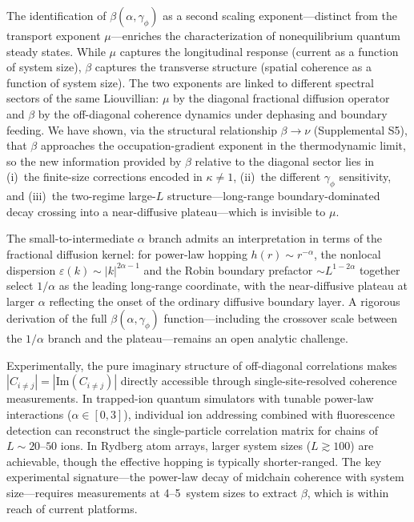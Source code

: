 \documentclass[aps,prd,twocolumn,superscriptaddress,floatfix]{revtex4-2}
\begin{document}
The identification of $\beta(\alpha,\gamma_\phi)$ as a second scaling
exponent---distinct from the transport exponent $\mu$---enriches the
characterization of nonequilibrium quantum steady states. While
$\mu$ captures the longitudinal response (current as a function of
system size), $\beta$ captures the transverse structure (spatial
coherence as a function of system size). The two exponents are linked
to different spectral sectors of the same Liouvillian: $\mu$ by the
diagonal fractional diffusion operator and $\beta$ by the
off-diagonal coherence dynamics under dephasing and boundary feeding.
We have shown, via the structural relationship $\beta \to \nu$
(Supplemental S5), that $\beta$ approaches the occupation-gradient
exponent in the thermodynamic limit, so the new information provided
by $\beta$ relative to the diagonal sector lies in (i)~the
finite-size corrections encoded in $\kappa \neq 1$, (ii)~the different
$\gamma_\phi$ sensitivity, and (iii)~the two-regime large-$L$
structure---long-range boundary-dominated decay crossing into a
near-diffusive plateau---which is invisible to $\mu$.

The small-to-intermediate $\alpha$ branch admits an interpretation in
terms of the fractional diffusion kernel: for power-law hopping
$h(r) \sim r^{-\alpha}$, the nonlocal dispersion
$\varepsilon(k) \sim |k|^{2\alpha-1}$ and the Robin boundary
prefactor $\sim L^{1-2\alpha}$ together select $1/\alpha$ as the
leading long-range coordinate, with the near-diffusive plateau at
larger $\alpha$ reflecting the onset of the ordinary diffusive
boundary layer. A rigorous derivation of the full
$\beta(\alpha,\gamma_\phi)$ function---including the crossover scale
between the $1/\alpha$ branch and the plateau---remains an open
analytic challenge.

Experimentally, the pure imaginary structure of off-diagonal
correlations makes
$|C_{i\neq j}| = |\text{Im}(C_{i\neq j})|$ directly accessible through
single-site-resolved coherence measurements. In trapped-ion quantum
simulators with tunable power-law interactions ($\alpha \in [0, 3]$),
individual ion addressing combined with fluorescence detection can
reconstruct the single-particle correlation matrix for chains of
$L \sim 20$--$50$ ions. In Rydberg atom arrays, larger system sizes
($L \gtrsim 100$) are achievable, though the effective hopping is
typically shorter-ranged. The key experimental signature---the
power-law decay of midchain coherence with system size---requires
measurements at 4--5~system sizes to extract $\beta$, which is within
reach of current platforms.
\end{document}
